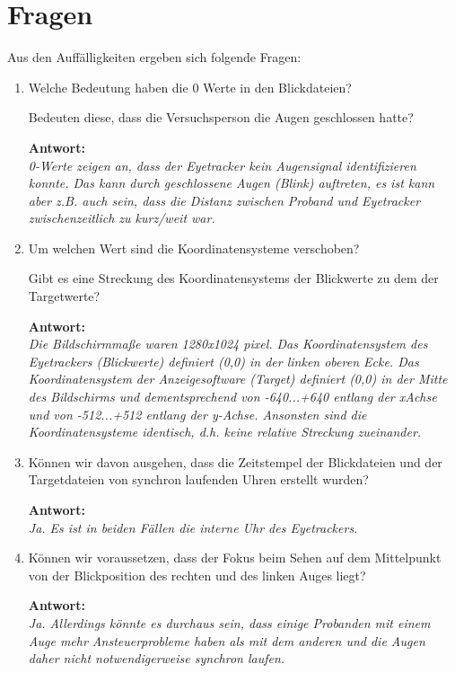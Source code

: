 \chapter{Fragen}
Aus den Auff\"alligkeiten ergeben sich folgende Fragen:
\begin{enumerate}
	\item Welche Bedeutung haben die 0 Werte in den Blickdateien?
	
	Bedeuten diese, dass die Versuchsperson die Augen geschlossen hatte?
	
	\textbf{Antwort:}\\
	\textit{0-Werte zeigen an, dass der Eyetracker kein Augensignal identifizieren konnte. Das kann durch geschlossene Augen (Blink) auftreten, es ist kann aber z.B. auch sein, dass die Distanz zwischen  Proband und Eyetracker zwischenzeitlich zu kurz/weit war.}
	
	\item Um welchen Wert sind die Koordinatensysteme verschoben?
	
	Gibt es eine Streckung des Koordinatensystems der Blickwerte zu dem der Targetwerte?
	
	\textbf{Antwort:}\\
	\textit{Die Bildschirmma\ss{}e waren 1280x1024 pixel. Das Koordinatensystem des Eyetrackers (Blickwerte) definiert (0,0) in der linken oberen Ecke. Das Koordinatensystem der Anzeigesoftware (Target) definiert (0,0) in der Mitte des Bildschirms und dementsprechend von -640...+640 entlang der xAchse und von -512...+512 entlang der y-Achse. Ansonsten sind die Koordinatensysteme identisch, d.h. keine relative Streckung zueinander.}
	
	\item K\"onnen wir davon ausgehen, dass die Zeitstempel der Blickdateien und der Targetdateien von synchron laufenden Uhren erstellt wurden?
	
	\textbf{Antwort:}\\
	\textit{Ja. Es ist in beiden F\"allen die interne Uhr des Eyetrackers.} 
	
	\item K\"onnen wir voraussetzen, dass der Fokus beim Sehen auf dem Mittelpunkt von der Blickposition des rechten und des linken Auges liegt?
	
	\textbf{Antwort:}\\
	\textit{Ja. Allerdings k\"onnte es durchaus sein, dass einige Probanden mit einem Auge mehr Ansteuerprobleme haben als mit dem anderen und die Augen daher nicht notwendigerweise synchron laufen.}
	
	
\end{enumerate}